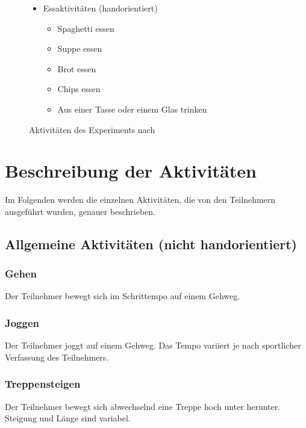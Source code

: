 \begin{figure}
\begin{itemize}
        \item Essaktivitäten (handorientiert)
        \begin{itemize} \item Spaghetti essen \end{itemize}
        \begin{itemize} \item Suppe essen \end{itemize}
        \begin{itemize} \item Brot essen \end{itemize}
        \begin{itemize} \item Chips essen \end{itemize}
        \begin{itemize} \item Aus einer Tasse oder einem Glas trinken \end{itemize}
    \end{itemize}
    \caption{Aktivitäten des Experiments nach \cite{Weiss2016}}
\end{figure}
\label{fig:activities}

\section{Beschreibung der Aktivitäten}
Im Folgenden werden die einzelnen Aktivitäten, die von den Teilnehmern ausgeführt wurden, genauer beschrieben.

\subsection{Allgemeine Aktivitäten (nicht handorientiert)}
\subsubsection{Gehen}
Der Teilnehmer bewegt sich im Schrittempo auf einem Gehweg.
\subsubsection{Joggen}
Der Teilnehmer joggt auf einem Gehweg. Das Tempo variiert je nach sportlicher Verfassung des Teilnehmers.
\subsubsection{Treppensteigen}
Der Teilnehmer bewegt sich abwechselnd eine Treppe hoch unter herunter. Steigung und Länge sind variabel.
